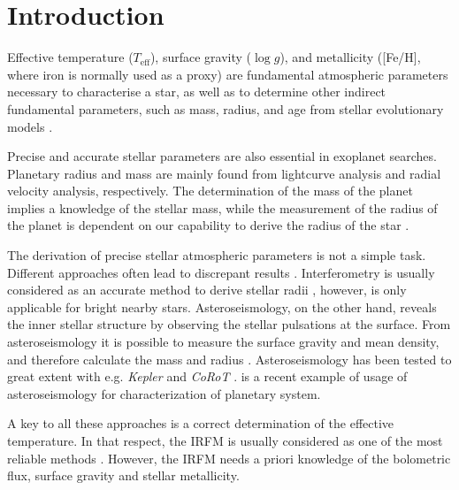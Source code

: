 \documentclass{aa}
\begin{document}
\maketitle



\section{Introduction}
\label{sec:introduction}

Effective temperature ($T_\mathrm{eff}$), surface gravity ($\log g$),
and metallicity ([Fe/H], where iron is normally used as a proxy)
are fundamental atmospheric parameters necessary to characterise a
star, as well as to determine other indirect fundamental parameters,
such as mass, radius, and age from stellar evolutionary models
\citep[e.g.][]{Girardi2000}.

Precise and accurate stellar parameters are also essential in
exoplanet searches. Planetary radius and mass are mainly found from
lightcurve analysis and radial velocity analysis, respectively. The
determination of the mass of the planet implies a knowledge of the
stellar mass, while the measurement of the radius of the planet
is dependent on our capability to derive the radius of the star
\citep{Ammler2009,Torres2008,Torres2012}.

The derivation of precise stellar atmospheric parameters is not a
simple task. Different approaches often lead to discrepant results
\citep[see e.g.][]{Santos13}. Interferometry is usually considered as an
accurate method to derive stellar radii \citep[e.g.][]{Boyajian2012},
however, is only applicable for bright nearby stars. Asteroseismology,
on the other hand, reveals the inner stellar structure by observing
the stellar pulsations at the surface. From asteroseismology it is possible
to measure the surface gravity and mean density, and therefore calculate the
mass and radius \citep[e.g.][]{Kjeldsen1995}. Asteroseismology has
been tested to great extent with e.g. \emph{Kepler} and \emph{CoRoT}
\citep{Michel2008,Huber2011,Huber2012}. \cite{Campante2015} is a recent
example of usage of asteroseismology for characterization of planetary
system.

A key to all these approaches is a correct determination
of the effective temperature. In that respect, the IRFM
is usually considered as one of the most reliable methods
\citep{Blackwell1977,Ramirez2005b,Casagrande2010}. However, the IRFM
needs a priori knowledge of the bolometric flux, surface gravity and
stellar metallicity.
\end{document}
